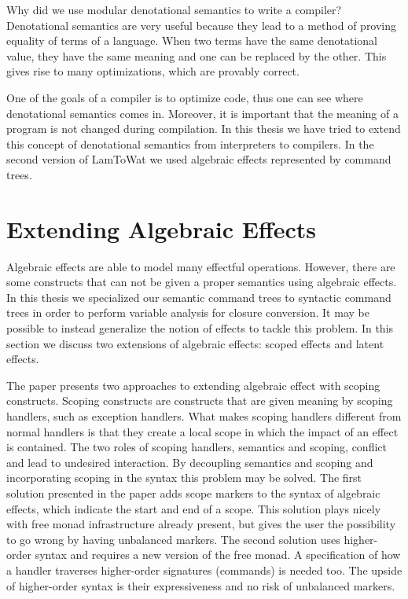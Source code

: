 Why did we use modular denotational semantics to write a compiler? Denotational semantics are very useful because they lead to a method of proving equality of terms of a language. When two terms have the same denotational value, they have the same meaning and one can be replaced by the other. This gives rise to many optimizations, which are provably correct.

One of the goals of a compiler is to optimize code, thus one can see where denotational semantics comes in. Moreover, it is important that the meaning of a program is not changed during compilation. In this thesis we have tried to extend this concept of denotational semantics from interpreters to compilers. In the second version of LamToWat we used algebraic effects represented by command trees.

\section{Extending Algebraic Effects}

Algebraic effects are able to model many effectful operations. However, there are some constructs that can not be given a proper semantics using algebraic effects. In this thesis we specialized our semantic command trees to syntactic command trees in order to perform variable analysis for closure conversion. It may be possible to instead generalize the notion of effects to tackle this problem. In this section we discuss two extensions of algebraic effects: scoped effects and latent effects.

The paper  \autocite{DBLP:conf/haskell/WuSH14} presents two approaches to extending algebraic effect with scoping constructs. Scoping constructs are constructs that are given meaning by scoping handlers, such as exception handlers. What makes scoping handlers different from normal handlers is that they create a local scope in which the impact of an effect is contained. The two roles of scoping handlers, semantics and scoping, conflict and lead to undesired interaction. By decoupling semantics and scoping and incorporating scoping in the syntax this problem may be solved. The first solution presented in the paper adds scope markers to the syntax of algebraic effects, which indicate the start and end of a scope. This solution plays nicely with free monad infrastructure already present, but gives the user the possibility to go wrong by having unbalanced markers. The second solution uses higher-order syntax and requires a new version of the free monad. A specification of how a handler traverses higher-order signatures (commands) is needed too. The upside of higher-order syntax is their expressiveness and no risk of unbalanced markers.

